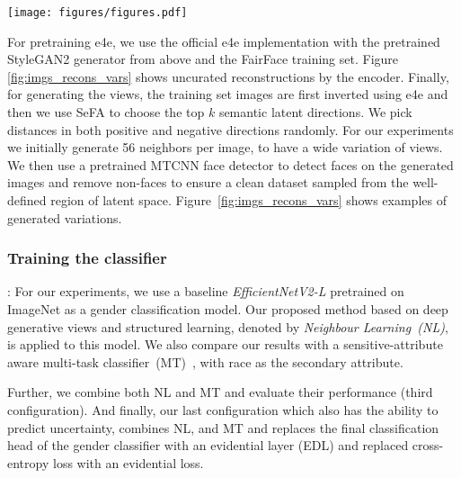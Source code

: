 \documentclass[runningheads]{llncs}
\begin{document}
\begin{figure*}
    \centering
    \texttt{[image: figures/figures.pdf]}
    \caption{(a) Uncurated images generated by StyleGAN2 trained on FairFace. (b) Images reconstructed using the trained e4e encoder and pretrained StyleGAN2 generator. (c) Generative views created by selecting top semantic latent directions with SeFA and randomly sampling along those directions.}
    \label{fig:imgs_recons_vars}
    \vspace{-0.2em}
\end{figure*}


For pretraining e4e, we use the official e4e implementation with the pretrained StyleGAN2 generator from above and the FairFace training set. Figure \ref{fig:imgs_recons_vars} shows uncurated reconstructions by the encoder. Finally, for generating the views, the training set images are first inverted using e4e and then we use SeFA to choose the top $k$ semantic latent directions. We pick distances in both positive and negative directions randomly. For our experiments we initially generate 56 neighbors per image, to have a wide variation of views. We then use a pretrained MTCNN face detector to detect faces on the generated images and remove non-faces to ensure a clean dataset sampled from the well-defined region of latent space. Figure~\ref{fig:imgs_recons_vars} shows examples of generated variations. 

\subsubsection{\textbf{Training the classifier}}: For our experiments, we use a baseline \emph{EfficientNetV2-L} pretrained on ImageNet as a gender classification model. Our proposed method based on deep generative views and structured learning, denoted by \emph{Neighbour Learning~(NL)}, is applied to this model. We also compare our results with a sensitive-attribute aware multi-task classifier~(MT)~\cite{multitask}, with race as the secondary attribute. 

Further, we combine both NL and MT and evaluate their performance (third configuration). And finally, our last configuration which also has the ability to predict uncertainty, combines NL, and MT and replaces the final classification head of the gender classifier with an evidential layer (EDL) and replaced cross-entropy loss with an evidential loss. 
\end{document}
